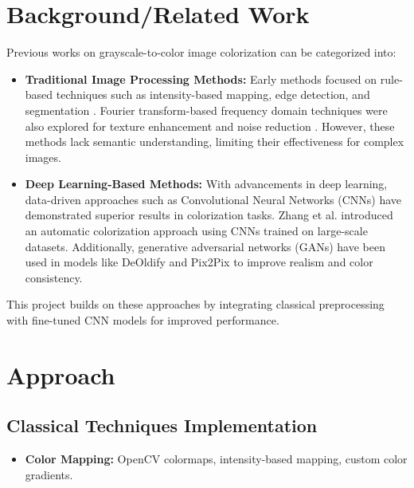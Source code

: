 \documentclass[conference]{IEEEtran}
\begin{document}
\section{Background/Related Work}
Previous works on grayscale-to-color image colorization can be categorized into:

\begin{itemize}
    \item \textbf{Traditional Image Processing Methods:} Early methods focused on rule-based techniques such as intensity-based mapping, edge detection, and segmentation \cite{levin2004colorization}. Fourier transform-based frequency domain techniques were also explored for texture enhancement and noise reduction \cite{gao2019fourier}. However, these methods lack semantic understanding, limiting their effectiveness for complex images.
    
    \item \textbf{Deep Learning-Based Methods:} With advancements in deep learning, data-driven approaches such as Convolutional Neural Networks (CNNs) have demonstrated superior results in colorization tasks. Zhang et al. \cite{zhang2016colorful} introduced an automatic colorization approach using CNNs trained on large-scale datasets. Additionally, generative adversarial networks (GANs) have been used in models like DeOldify \cite{antic2019deoldify} and Pix2Pix \cite{isola2017image} to improve realism and color consistency.
\end{itemize}
This project builds on these approaches by integrating classical preprocessing with fine-tuned CNN models for improved performance.

\section{Approach}

\subsection{Classical Techniques Implementation}
\begin{itemize}
    \item \textbf{Color Mapping:} OpenCV colormaps, intensity-based mapping, custom color gradients.
\end{itemize}
\end{document}
